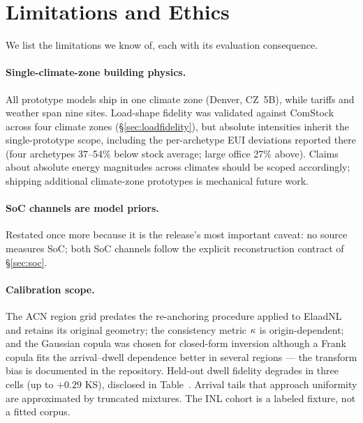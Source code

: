 \section{Limitations and Ethics}
\label{sec:limitations}

We list the limitations we know of, each with its evaluation consequence.

\paragraph{Single-climate-zone building physics.}
All prototype models ship in one climate zone (Denver, CZ~5B), while tariffs
and weather span nine sites. Load-shape fidelity was validated against
ComStock across four climate zones (\S\ref{sec:loadfidelity}), but absolute
intensities inherit the single-prototype scope, including the per-archetype
EUI deviations reported there (four archetypes 37--54\% below stock average;
large office 27\% above). Claims about absolute energy magnitudes across
climates should be scoped accordingly; shipping additional climate-zone
prototypes is mechanical future work.

\paragraph{SoC channels are model priors.}
Restated once more because it is the release's most important caveat: no
source measures SoC; both SoC channels follow the explicit reconstruction
contract of \S\ref{sec:soc}.

\paragraph{Calibration scope.}
The ACN region grid predates the re-anchoring procedure applied to ElaadNL
and retains its original geometry; the consistency metric $\kappa$ is
origin-dependent; and the Gaussian copula was chosen for closed-form
inversion although a Frank copula fits the arrival--dwell dependence better
in several regions --- the transform bias is documented in the repository.
Held-out dwell fidelity degrades in three cells (up to $+0.29$ KS), disclosed
in Table~. Arrival tails that approach uniformity are approximated by
truncated mixtures. The INL cohort is a labeled fixture, not a fitted corpus.

